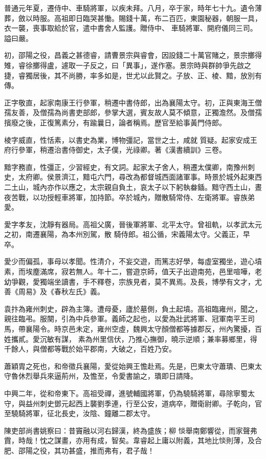 \begin{pinyinscope}
 普通元年夏，遷侍中、車騎將軍，以疾未拜。八月，卒于家，時年七十九。遺令薄葬，斂以時服。高祖即日臨哭甚慟。賜錢十萬，布二百匹，東園秘器，朝服一具，衣一襲，喪事取給於官，遣中書舍人監護。贈侍中、
 車騎將軍、開府儀同三司。謚曰嚴。



 初，邵陽之役，昌義之甚德睿，請曹景宗與睿會，因設錢二十萬官賭之，景宗擲得雉，睿徐擲得盧，遽取一子反之，曰「異事」，遂作塞。景宗時與群帥爭先啟之捷，睿獨居後，其不尚勝，率多如是，世尤以此賢之。子放、正、棱、黯，放別有傳。



 正字敬直，起家南康王行參軍，稍遷中書侍郎，出為襄陽太守。初，正與東海王僧孺友善，及僧孺為尚書吏部郎，參掌大選，賓友故人莫不傾意，正獨澹然。及僧孺擯廢之後，正復篤素分，有踰曩日，論者稱焉。歷官至給事黃門侍郎。



 棱字威直，性恬素，以書史為業，博物彊記，當世之士，咸就
 質疑。起家安成王府行參軍，稍遷治書侍御史，太子僕，光祿卿。著《漢書續訓》三卷。



 黯字務直，性彊正，少習經史，有文詞。起家太子舍人，稍遷太僕卿，南豫州刺史，太府卿。侯景濟江，黯屯六門，尋改為都督城西面諸軍事。時景於城外起東西二土山，城內亦作以應之，太宗親自負土，哀太子以下躬執畚鍤。黯守西土山，晝夜苦戰，以功授輕車將軍，加持節。卒於城內，贈散騎常侍、左衛將軍。睿族弟愛。



 愛字孝友，沈靜有器局。高祖父廣，晉後軍將軍、北平太守。曾祖軌，以孝武太元之初，南遷襄陽，為本州別駕，散
 騎侍郎。祖公循，宋義陽太守。父義正，早卒。



 愛少而偏孤，事母以孝聞。性清介，不妄交遊，而篤志好學，每虛室獨坐，遊心墳素，而埃塵滿席，寂若無人。年十二，嘗遊京師，值天子出遊南苑，邑里喧嘩，老幼爭觀，愛獨端坐讀書，手不釋卷，宗族見者，莫不異焉。及長，博學有文才，尤善《周易》及《春秋左氏》義。



 袁抃為雍州刺史，辟為主簿。遭母憂，廬於墓側，負土起墳。高祖臨雍州，聞之，親往臨弔。服闋，引為中兵參軍。義師之起也，以愛為壯武將軍、冠軍南平王司馬，帶襄陽令。時京邑未定，雍州空虛，魏興太守顏僧都等據郡反，州內驚擾，百姓攜貳。愛沉敏有謀，
 素為州里信伏，乃推心撫御，曉示逆順；兼率募鄉里，得千餘人，與僧都等戰於始平郡南，大破之，百姓乃安。



 蕭穎胄之死也，和帝徵兵襄陽，愛從始興王憺赴焉。先是，巴東太守蕭璝、巴東太守魯休烈舉兵來逼荊州，及憺至，令愛書諭之，璝即日請降。



 中興二年，從和帝東下。高祖受禪，進號輔國將軍，仍為驍騎將軍，尋除寧蜀太守，與益州刺史鄧元起西上襲劉季連，行至公安，道病卒，贈衛尉卿。子乾向，官至驍騎將軍，征北長史，汝陰、鐘離二郡太守。



 陳吏部尚書姚察曰：昔竇融以河右歸漢，終為盛族；柳
 惔舉南鄭響從，而家聲弗霣，時哉！忱之謀畫，亦用有成，智矣。韋睿起上庸以附義，其地比惔則薄，及合肥、邵陽之役，其功甚盛，推而弗有，君子哉！



\end{pinyinscope}